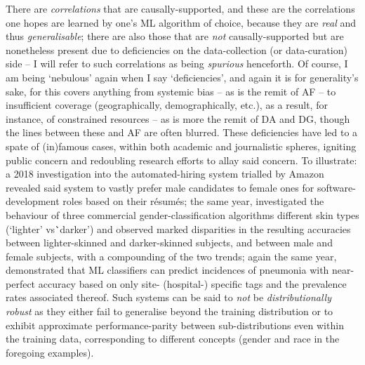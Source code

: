 %
There are \emph{correlations} that are causally-supported, and these are the correlations one hopes
are learned by one's \ac{ML} algorithm of choice, because they are \emph{real} and thus
\emph{generalisable}; there are also those that are \emph{not} causally-supported but are
nonetheless present due to deficiencies on the data-collection (or data-curation) side -- I will
refer to such correlations as being \emph{spurious} henceforth.
%
Of course, I am being `nebulous' again when I say `deficiencies', and again it is for generality's
sake, for this covers anything from systemic bias -- as is the remit of \ac{AF} -- to insufficient
coverage (geographically, demographically, etc.), as a result, for instance, of constrained
resources -- as is more the remit of \ac{DA} and \ac{DG}, though the lines between these and AF are
often blurred.
%
These deficiencies have led to a spate of (in)famous cases, within both academic and journalistic
spheres, igniting public concern and redoubling research efforts to allay said concern.
%
To illustrate: a 2018 investigation \citep{dastin2018amazon} into the automated-hiring system
trialled by Amazon revealed said system to vastly prefer male candidates to female ones for
software-development roles based on their r\'esum\'es; the same year, \citet{buolamwini2018gender}
investigated the behaviour of three commercial gender-classification algorithms \wrt{} different
skin types (`lighter' vs\. `darker') and observed marked disparities in the resulting accuracies
between lighter-skinned and darker-skinned subjects, and between male and female subjects, with a
compounding of the two trends; again the same year, \citet{zech2018variable} demonstrated that
\ac{ML} classifiers can predict incidences of pneumonia with near-perfect accuracy based on only
site- (hospital-) specific tags and the prevalence rates associated thereof.
%
Such systems can be said to \emph{not} be \emph{distributionally robust} as they either fail to
generalise beyond the training distribution or to exhibit approximate performance-parity between
sub-distributions even within the training data, corresponding to different concepts (gender and
race in the foregoing examples).

